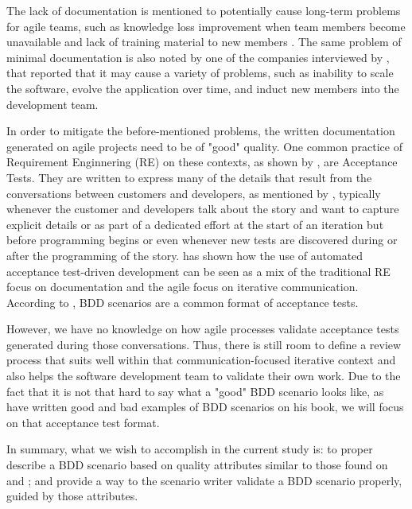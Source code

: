 The lack of documentation is mentioned to potentially cause long-term problems for agile teams, such as knowledge loss improvement when team members become unavailable and lack of training material to new members \cite{Paetsch_2003}. The same problem of minimal documentation is also noted by one of the companies interviewed by \cite{Cao_2008}, that reported that it may cause a variety of problems, such as inability to scale the software, evolve the application over time, and induct new members into the development team.

In order to mitigate the before-mentioned problems, the written documentation generated on agile projects need to be of "good" quality. One common practice of Requirement Enginnering (RE) on these contexts, as shown by \cite{Cao_2008}, are Acceptance Tests. They are written to express many of the details that result from the conversations between customers and developers, as mentioned by \cite{Cohn_2004}, typically  whenever the customer and developers talk about the story and want to capture explicit details or as part of a dedicated effort at the start of an iteration but before programming begins or even whenever new tests are discovered during or after the programming of the story. \cite{Haugset_2012} has shown how the use of automated acceptance test-driven development can be seen as a mix of the traditional RE focus on documentation and the agile focus on iterative communication. According to \cite{Gartner_2012}, BDD scenarios are a common format of acceptance tests. 

However, we have no knowledge on how agile processes validate acceptance tests generated during those conversations. Thus, there is still room to define a review process that suits well within that communication-focused iterative context and also helps the software development team to validate their own work. Due to the fact that it is not that hard to say what a "good" BDD scenario looks like, as \cite{Smart_2014} have written good and bad examples of BDD scenarios on his book, we will focus on that acceptance test format. 

In summary, what we wish to accomplish in the current study is: to proper describe a BDD scenario based on quality attributes similar to those found on \cite{Babok_2009} and \cite{Babok_2015}; and provide a way to the scenario writer validate a BDD scenario properly, guided by those attributes.
